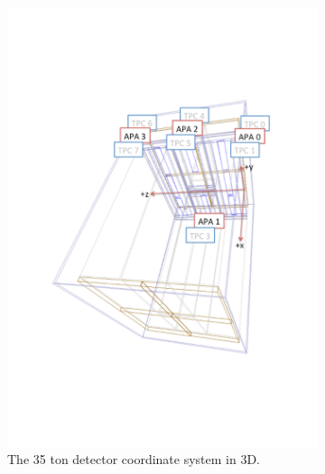 \begin{figure}
  \centering
  \begin{subfigure}{0.48\textwidth}
    \centering
    \includegraphics[width=\textwidth]{35ton_APASchem}
    \caption{The 35 ton detector coordinate system in 3D.}
  \end{subfigure}%
  \begin{subfigure}{0.48\textwidth}
    \centering

\end{subfigure}
\end{figure}
